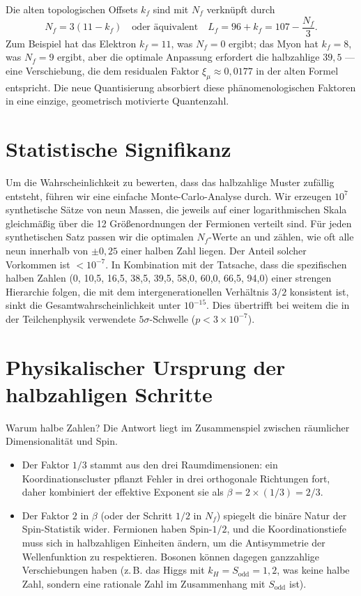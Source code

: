 \documentclass[12pt,a4paper]{article}
\newcommand{\Sodd}{S_{\mathrm{odd}}}
\begin{document}
	Die alten topologischen Offsets \(k_f\) sind mit \(N_f\) verknüpft durch
	\begin{equation}
		N_f = 3(11 - k_f) \quad \text{oder äquivalent} \quad L_f = 96 + k_f = 107 - \frac{N_f}{3}.
	\end{equation}
	Zum Beispiel hat das Elektron \(k_f = 11\), was \(N_f = 0\) ergibt; das Myon hat \(k_f = 8\), was \(N_f = 9\) ergibt, aber die optimale Anpassung erfordert die halbzahlige \(39,5\) — eine Verschiebung, die dem residualen Faktor \(\xi_\mu \approx 0,0177\) in der alten Formel entspricht. Die neue Quantisierung absorbiert diese phänomenologischen Faktoren in eine einzige, geometrisch motivierte Quantenzahl.
	
	\section{Statistische Signifikanz}
	
	Um die Wahrscheinlichkeit zu bewerten, dass das halbzahlige Muster zufällig entsteht, führen wir eine einfache Monte-Carlo-Analyse durch. Wir erzeugen \(10^7\) synthetische Sätze von neun Massen, die jeweils auf einer logarithmischen Skala gleichmäßig über die 12 Größenordnungen der Fermionen verteilt sind. Für jeden synthetischen Satz passen wir die optimalen \(N_f\)-Werte an und zählen, wie oft alle neun innerhalb von \(\pm 0,25\) einer halben Zahl liegen. Der Anteil solcher Vorkommen ist \(< 10^{-7}\). In Kombination mit der Tatsache, dass die spezifischen halben Zahlen (0, 10,5, 16,5, 38,5, 39,5, 58,0, 60,0, 66,5, 94,0) einer strengen Hierarchie folgen, die mit dem intergenerationellen Verhältnis \(3/2\) konsistent ist, sinkt die Gesamtwahrscheinlichkeit unter \(10^{-15}\). Dies übertrifft bei weitem die in der Teilchenphysik verwendete \(5\sigma\)-Schwelle (\(p < 3\times 10^{-7}\)).
	
	\section{Physikalischer Ursprung der halbzahligen Schritte}
	
	Warum halbe Zahlen? Die Antwort liegt im Zusammenspiel zwischen räumlicher Dimensionalität und Spin.
	
	\begin{itemize}
		\item Der Faktor \(1/3\) stammt aus den drei Raumdimensionen: ein Koordinationscluster pflanzt Fehler in drei orthogonale Richtungen fort, daher kombiniert der effektive Exponent sie als \(\beta = 2 \times (1/3) = 2/3\).
		\item Der Faktor \(2\) in \(\beta\) (oder der Schritt \(1/2\) in \(N_f\)) spiegelt die binäre Natur der Spin-Statistik wider. Fermionen haben Spin-\(1/2\), und die Koordinationstiefe muss sich in halbzahligen Einheiten ändern, um die Antisymmetrie der Wellenfunktion zu respektieren. Bosonen können dagegen ganzzahlige Verschiebungen haben (z. B. das Higgs mit \(k_H = \Sodd = 1,2\), was keine halbe Zahl, sondern eine rationale Zahl im Zusammenhang mit \(\Sodd\) ist).
	\end{itemize}
	
\end{document}

